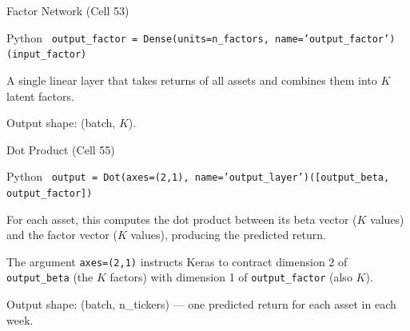 \documentclass[aspectratio=169, 11pt]{beamer}
\begin{document}
%
%
\begin{frame}{Factor Network (Cell 53)}

\begin{block}{Python}
\small
\texttt{
output\_factor = Dense(units=n\_factors, name='output\_factor')(input\_factor)
}
\end{block}

\vspace{0.3cm}

A single linear layer that takes returns of all assets and combines them into $K$ latent factors.

\vspace{0.3cm}

Output shape: (batch, $K$).

\end{frame}
%
%
\begin{frame}{Dot Product (Cell 55)}

\begin{block}{Python}
\small
\texttt{
output = Dot(axes=(2,1), name='output\_layer')([output\_beta, output\_factor])
}
\end{block}

\vspace{0.3cm}

For each asset, this computes the dot product between its beta vector ($K$ values) and the factor vector ($K$ values), producing the predicted return.

\vspace{0.3cm}

The argument \texttt{axes=(2,1)} instructs Keras to contract dimension 2 of \texttt{output\_beta} (the $K$ factors) with dimension 1 of \texttt{output\_factor} (also $K$).

\vspace{0.3cm}

Output shape: (batch, n\_tickers) — one predicted return for each asset in each week.

\end{frame}
%
%
\end{document}
